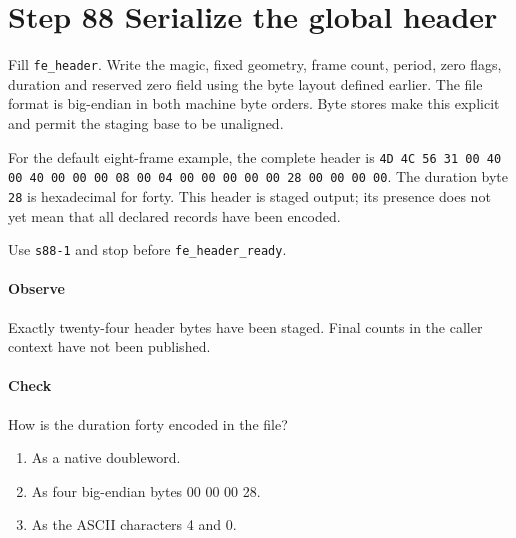 \section{Step 88 Serialize the global header}
Fill \texttt{fe\_header}. Write the magic, fixed geometry, frame count, period, zero flags, duration and reserved zero field using the byte layout defined earlier. The file format is big-endian in both machine byte orders. Byte stores make this explicit and permit the staging base to be unaligned.

For the default eight-frame example, the complete header is
\texttt{4D 4C 56 31 00 40 00 40 00 00 00 08 00 04 00 00 00 00 00 28 00 00 00 00}.
The duration byte \texttt{28} is hexadecimal for forty. This header is staged output; its presence does not yet mean that all declared records have been encoded.

Use \texttt{s88-1} and stop before \texttt{fe\_header\_ready}.

\paragraph{Observe} Exactly twenty-four header bytes have been staged. Final counts in the caller context have not been published.

\paragraph{Check} How is the duration forty encoded in the file?
\begin{enumerate}[label=\Alph*.]
\item As a native doubleword.
\item As four big-endian bytes 00 00 00 28.
\item As the ASCII characters 4 and 0.
\end{enumerate}
